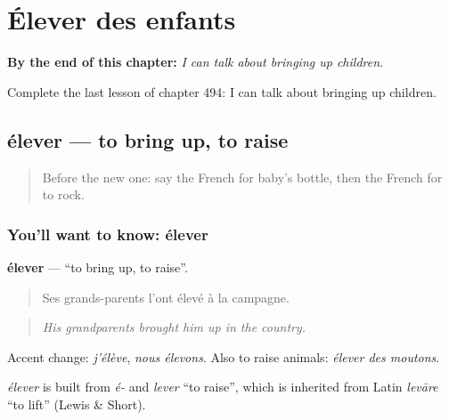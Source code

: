 
\chapter{Élever des enfants}
\label{ch:fr-elever-des-enfants}

\begin{chapteropening}
\textbf{By the end of this chapter:} \emph{I can talk about bringing up children.}

Complete the last lesson of chapter 494: I can talk about bringing up children.
\end{chapteropening}

\section[élever]{élever — to bring up, to raise}

\label{lesson:FR-C494-elever}



\begin{quote}
Before the new one: say the French for baby's bottle, then the French for to rock.
\end{quote}

\subsection*{You'll want to know: élever}
\textbf{élever} — \textquotedblleft{}to bring up, to raise\textquotedblright{}.

\begin{quote}
Ses grands-parents l'ont élevé à la campagne.
\end{quote}

\begin{quote}
\emph{His grandparents brought him up in the country.}
\end{quote}

Accent change: \emph{j'élève}, \emph{nous élevons}. Also to raise animals: \emph{élever des moutons}.

\begin{cousinweb}
\emph{élever} is built from \emph{é-} and \emph{lever} \textquotedblleft{}to raise\textquotedblright{}, which is inherited from Latin \emph{levāre} \textquotedblleft{}to lift\textquotedblright{} (Lewis \& Short).
\end{cousinweb}

